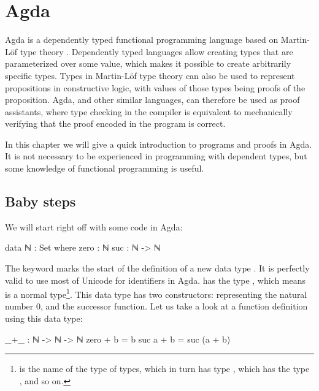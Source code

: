 
\chapter{Agda} \label{Agda}

	Agda is a dependently typed functional programming language based on
	Martin-Löf type theory \cite{?}. Dependently typed languages allow creating
	types that are parameterized over some value, which makes it possible to
	create arbitrarily specific types. Types in Martin-Löf type theory can also
	be used to represent propositions in constructive logic, with values of
	those types being proofs of the proposition. Agda, and other similar
	languages, can therefore be used as proof assistants, where type checking
	in the compiler is equivalent to mechanically verifying that the proof
	encoded in the program is correct.

	In this chapter we will give a quick introduction to programs and proofs in
	Agda. It is not necessary to be experienced in programming with dependent
	types, but some knowledge of functional programming is useful.

	\section{Baby steps}

		We will start right off with some code in Agda:

                \agdaNat
		\begin{code}
			data ℕ : Set where
			  zero : ℕ
			  suc : ℕ -> ℕ
		\end{code}

		The keyword  marks the start of the definition of a new
		data type . It is perfectly valid to use most of Unicode for
		identifiers in Agda.  has the type , which means
		 is a normal type\footnote{ is the name of the
		type of types, which in turn has type , which has the type
		, and so on.}. This data type has two constructors:
		 representing the natural number $0$, and
		 the successor function.  Let us take a look at a function
		definition using this data type:

                \agdaPlus
		\begin{code}
			_+_ : ℕ -> ℕ -> ℕ
			zero + b = b
			suc a + b = suc (a + b)
		\end{code}

